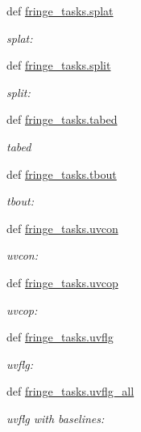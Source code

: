 \begin{DoxyCompactItemize}
def \hyperlink{namespacefringe__tasks_a2f5aa4b2707b80537f15eb5119073c05}{fringe\-\_\-tasks.\-splat}
\begin{DoxyCompactList}\small\item\em splat\-: \end{DoxyCompactList}\item 
def \hyperlink{namespacefringe__tasks_a4ad1c84727da6e262ebe7557f995617e}{fringe\-\_\-tasks.\-split}
\begin{DoxyCompactList}\small\item\em split\-: \end{DoxyCompactList}\item 
def \hyperlink{namespacefringe__tasks_a8403a091429e0389dd57136bc23c7ecc}{fringe\-\_\-tasks.\-tabed}
\begin{DoxyCompactList}\small\item\em tabed \end{DoxyCompactList}\item 
def \hyperlink{namespacefringe__tasks_a472a70579832cc7bd0ea4a4648a65c3c}{fringe\-\_\-tasks.\-tbout}
\begin{DoxyCompactList}\small\item\em tbout\-: \end{DoxyCompactList}\item 
def \hyperlink{namespacefringe__tasks_a6ae2ba3ea7d68b14400ee7d67becdefd}{fringe\-\_\-tasks.\-uvcon}
\begin{DoxyCompactList}\small\item\em uvcon\-: \end{DoxyCompactList}\item 
def \hyperlink{namespacefringe__tasks_a5d9274e65cc382b9a7d02fa8e7ba0f8d}{fringe\-\_\-tasks.\-uvcop}
\begin{DoxyCompactList}\small\item\em uvcop\-: \end{DoxyCompactList}\item 
def \hyperlink{namespacefringe__tasks_a458bc9cbc14420594c74d9e23cc06460}{fringe\-\_\-tasks.\-uvflg}
\begin{DoxyCompactList}\small\item\em uvflg\-: \end{DoxyCompactList}\item 
def \hyperlink{namespacefringe__tasks_a79e526a8a2bf216e75d6cca6459b9c1e}{fringe\-\_\-tasks.\-uvflg\-\_\-all}
\begin{DoxyCompactList}\small\item\em uvflg with baselines\-: \end{DoxyCompactList}\item 

\end{DoxyCompactItemize}
